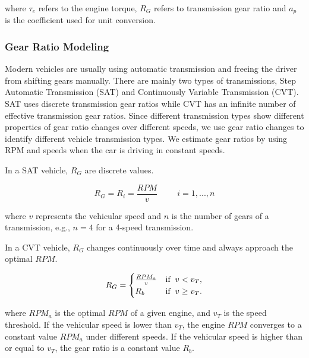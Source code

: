 where $\tau_e$ refers to the engine torque, 
$R_G$ refers to transmission gear ratio
and $a_p$ is the coefficient used for unit conversion. 


\subsubsection{Gear Ratio Modeling}

Modern vehicles are usually using automatic transmission and 
freeing the driver from shifting gears manually. 
There are mainly two types of transmissions, 
Step Automatic Transmission (SAT) and Continuously Variable Transmission (CVT). 
SAT uses discrete transmission gear ratios while CVT has an
infinite number of effective transmission gear ratios. 
Since different transmission types show different
properties of gear ratio changes over different speeds, 
we use gear ratio changes to identify different
vehicle transmission types. 
We estimate gear ratios by using RPM and speeds 
when the car is driving in constant speeds. 



In a SAT vehicle, $R_G$ are discrete values.
  
\begin{equation}
   R_G = R_i = \frac{RPM}{v}  \hspace{1cm} i = 1,...,n
 \end{equation}

where $v$ represents the vehicular speed 
and $n$ is the number of gears of a transmission, 
e.g., $n=4$ for a 4-speed transmission. 

In a CVT vehicle, $R_G$ changes continuously over time and always
approach the optimal $RPM$. 

\begin{equation}
   R_G =
   \begin{cases}
   \frac{RPM_a}{v}     &  \mbox{if} \hspace{0.2cm} v < v_T, \\
   R_b   &  \mbox{if} \hspace{0.2cm} v \geq v_T.
   \end{cases}
  \end{equation}

where $RPM_a$ is the optimal $RPM$ of a given engine, 
and $v_T$ is the speed threshold. 
If the vehicular speed is lower than $v_T$, 
the engine $RPM$ converges to a constant value $RPM_a$ under
different speeds. 
If the vehicular speed is higher than or equal to $v_T$, 
the gear ratio is a constant value $R_b$. 



